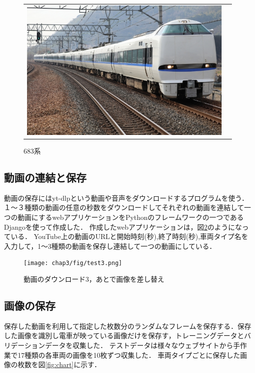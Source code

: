 \begin{figure}[htbp]
\begin{tabular}{cc}
\begin{minipage}[b]{0.15\textwidth}
			\includegraphics[width=\linewidth]{densya/683.jpg}
			\caption{683系}
			\label{fig:683}
		\end{minipage}
	\end{tabular}
\end{figure}


\subsection{動画の連結と保存}
動画の保存にはyt-dlpという動画や音声をダウンロードするプログラムを使う．
１〜３種類の動画の任意の秒数をダウンロードしてそれぞれの動画を連結して一つの動画にするwebアプリケーションをPythonのフレームワークの一つであるDjangoを使って作成した．
	作成したwebアプリケーションは，図\ref{test3}のようになっている．
	YouTube上の動画のURLと開始時刻(秒),終了時刻(秒),車両タイプ名を入力して，1〜3種類の動画を保存し連結して一つの動画にしている．
	
\begin{figure}[H]
	\texttt{[image: chap3/fig/test3.png]}
	\caption{動画のダウンロード3，あとで画像を差し替え}
	\label{test3}
\end{figure}

\subsection{画像の保存}
保存した動画を利用して指定した枚数分のランダムなフレームを保存する．保存した画像を識別し電車が映っている画像だけを保存す，トレーニングデータとバリデーションデータを収集した．
テストデータは様々なウェブサイトから手作業で17種類の各車両の画像を10枚ずつ収集した．
車両タイプごとに保存した画像の枚数を図\ref{fig:chart}に示す．

